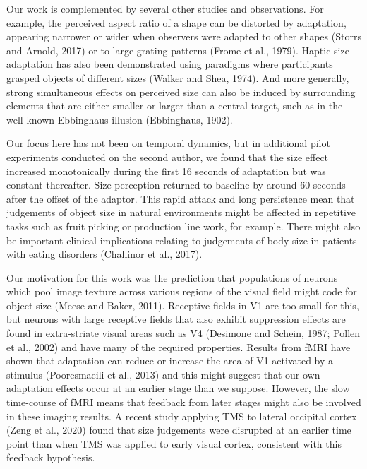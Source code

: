 \documentclass[
]{article}
\begin{document}
Our work is complemented by several other studies and observations. For example, the perceived aspect ratio of a shape can be distorted by adaptation, appearing narrower or wider when observers were adapted to other shapes (Storrs and Arnold, 2017) or to large grating patterns (Frome et al., 1979). Haptic size adaptation has also been demonstrated using paradigms where participants grasped objects of different sizes (Walker and Shea, 1974). And more generally, strong simultaneous effects on perceived size can also be induced by surrounding elements that are either smaller or larger than a central target, such as in the well-known Ebbinghaus illusion (Ebbinghaus, 1902).

Our focus here has not been on temporal dynamics, but in additional pilot experiments conducted on the second author, we found that the size effect increased monotonically during the first 16 seconds of adaptation but was constant thereafter. Size perception returned to baseline by around 60 seconds after the offset of the adaptor. This rapid attack and long persistence mean that judgements of object size in natural environments might be affected in repetitive tasks such as fruit picking or production line work, for example. There might also be important clinical implications relating to judgements of body size in patients with eating disorders (Challinor et al., 2017).

Our motivation for this work was the prediction that populations of neurons which pool image texture across various regions of the visual field might code for object size (Meese and Baker, 2011). Receptive fields in V1 are too small for this, but neurons with large receptive fields that also exhibit suppression effects are found in extra-striate visual areas such as V4 (Desimone and Schein, 1987; Pollen et al., 2002) and have many of the required properties. Results from fMRI have shown that adaptation can reduce or increase the area of V1 activated by a stimulus (Pooresmaeili et al., 2013) and this might suggest that our own adaptation effects occur at an earlier stage than we suppose. However, the slow time-course of fMRI means that feedback from later stages might also be involved in these imaging results. A recent study applying TMS to lateral occipital cortex (Zeng et al., 2020) found that size judgements were disrupted at an earlier time point than when TMS was applied to early visual cortex, consistent with this feedback hypothesis.
\end{document}

